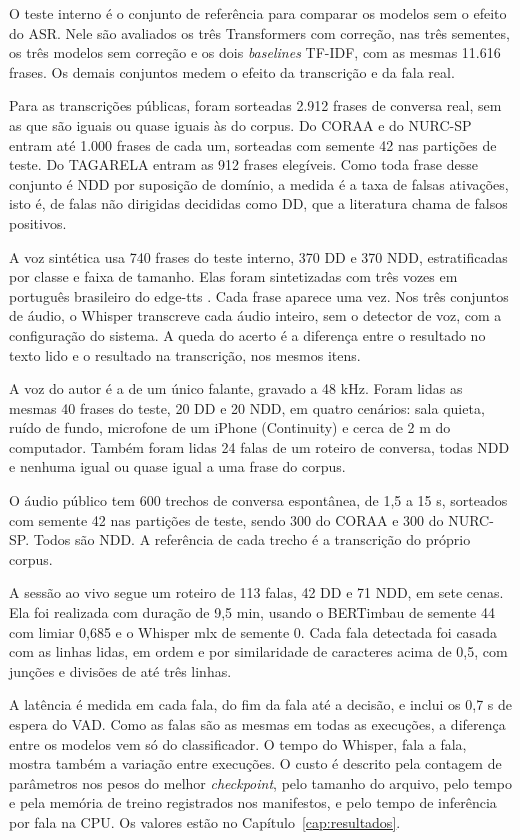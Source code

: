 \documentclass[
    12pt,                %
    openright,           %
    oneside,             %
    a4paper,             %
    english,             %
    brazil               %
]{abntex2}
\begin{document}
O teste interno é o conjunto de referência para comparar os modelos sem o efeito do ASR. Nele são avaliados os três Transformers com correção, nas três sementes, os três modelos sem correção e os dois \textit{baselines} TF-IDF, com as mesmas 11.616 frases. Os demais conjuntos medem o efeito da transcrição e da fala real.

Para as transcrições públicas, foram sorteadas 2.912 frases de conversa real, sem as que são iguais ou quase iguais às do corpus. Do CORAA e do NURC-SP entram até 1.000 frases de cada um, sorteadas com semente 42 nas partições de teste. Do TAGARELA entram as 912 frases elegíveis. Como toda frase desse conjunto é NDD por suposição de domínio, a medida é a taxa de falsas ativações, isto é, de falas não dirigidas decididas como DD, que a literatura chama de falsos positivos.

A voz sintética usa 740 frases do teste interno, 370 DD e 370 NDD, estratificadas por classe e faixa de tamanho. Elas foram sintetizadas com três vozes em português brasileiro do edge-tts \cite{EdgeTTS}. Cada frase aparece uma vez. Nos três conjuntos de áudio, o Whisper transcreve cada áudio inteiro, sem o detector de voz, com a configuração do sistema. A queda do acerto é a diferença entre o resultado no texto lido e o resultado na transcrição, nos mesmos itens.

A voz do autor é a de um único falante, gravado a 48 kHz. Foram lidas as mesmas 40 frases do teste, 20 DD e 20 NDD, em quatro cenários: sala quieta, ruído de fundo, microfone de um iPhone (Continuity) e cerca de 2 m do computador. Também foram lidas 24 falas de um roteiro de conversa, todas NDD e nenhuma igual ou quase igual a uma frase do corpus. 

O áudio público tem 600 trechos de conversa espontânea, de 1,5 a 15 s, sorteados com semente 42 nas partições de teste, sendo 300 do CORAA e 300 do NURC-SP. Todos são NDD. A referência de cada trecho é a transcrição do próprio corpus.

A sessão ao vivo segue um roteiro de 113 falas, 42 DD e 71 NDD, em sete cenas. Ela foi realizada com duração de 9,5 min, usando o BERTimbau de semente 44 com limiar 0,685 e o Whisper mlx de semente 0. Cada fala detectada foi casada com as linhas lidas, em ordem e por similaridade de caracteres acima de 0,5, com junções e divisões de até três linhas.

A latência é medida em cada fala, do fim da fala até a decisão, e inclui os 0,7 s de espera do VAD. Como as falas são as mesmas em todas as execuções, a diferença entre os modelos vem só do classificador. O tempo do Whisper, fala a fala, mostra também a variação entre execuções. O custo é descrito pela contagem de parâmetros nos pesos do melhor \textit{checkpoint}, pelo tamanho do arquivo, pelo tempo e pela memória de treino registrados nos manifestos, e pelo tempo de inferência por fala na CPU. Os valores estão no Capítulo~\ref{cap:resultados}.
\end{document}
